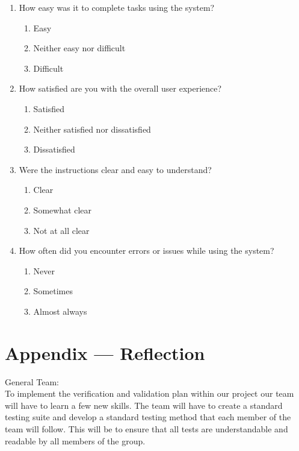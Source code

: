 \documentclass[12pt, titlepage]{article}
\begin{document}
\begin{enumerate}

\item How easy was it to complete tasks using the system?
\begin{enumerate}
\item Easy
\item Neither easy nor difficult
\item Difficult
\end{enumerate}

\item How satisfied are you with the overall user experience?
\begin{enumerate}
\item Satisfied
\item Neither satisfied nor dissatisfied
\item Dissatisfied
\end{enumerate}

\item Were the instructions clear and easy to understand?
\begin{enumerate}
\item Clear
\item Somewhat clear
\item Not at all clear
\end{enumerate}

\item How often did you encounter errors or issues while using the system?
\begin{enumerate}
\item Never
\item Sometimes
\item Almost always
\end{enumerate}
\end{enumerate}
\newpage{}
\section*{Appendix --- Reflection}
General Team:\\

\noindent To implement the verification and validation plan within our project our team will have to learn a few new skills. The team will have to create a standard testing suite and develop a standard testing method that each member of the team will follow. This will be to ensure that all tests are understandable and readable by all members of the group. \\
\end{document}
